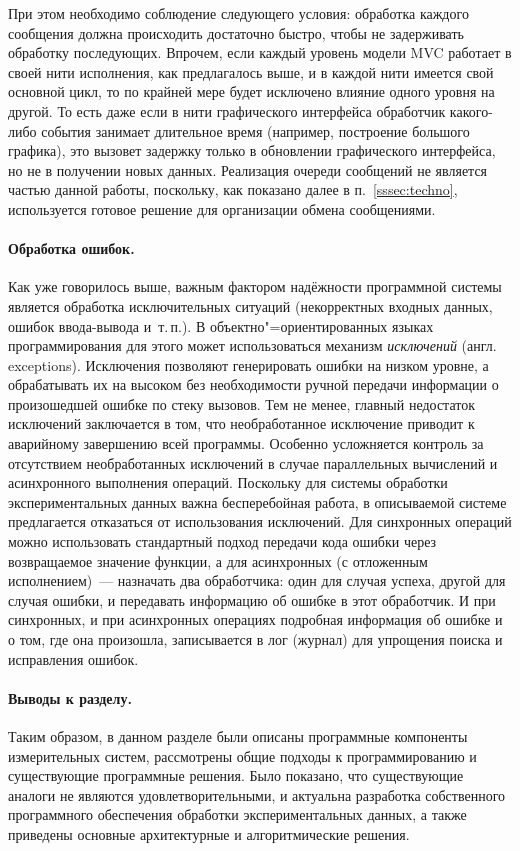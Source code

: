 \documentclass[a4paper, 14pt, titlepage]{extarticle}
\newcommand{\eng}[1]{\foreignlanguage{english}{#1}}
\newcommand{\term}[1]{\emph{#1}}
\begin{document}
  При этом необходимо соблюдение следующего условия: обработка каждого сообщения должна происходить
  достаточно быстро, чтобы не задерживать обработку
  последующих. Впрочем, если каждый уровень модели MVC работает в своей нити исполнения, как
  предлагалось выше, и в каждой нити имеется свой основной цикл, то по крайней мере будет
  исключено влияние одного уровня на другой. То есть даже если в нити графического интерфейса
  обработчик какого-либо события занимает длительное время (например, построение большого графика),
  это вызовет задержку только в обновлении графического интерфейса, но не в получении новых данных.
  Реализация очереди сообщений не является частью данной работы, поскольку, как показано далее
  в п.~\ref{sssec:techno}, используется готовое решение для организации обмена сообщениями.

  \paragraph{Обработка ошибок.} Как уже говорилось выше, важным фактором надёжности программной
  системы является обработка исключительных ситуаций (некорректных входных данных, ошибок
  ввода-вывода и~т.\,п.). В объектно"=ориентированных языках программирования для этого может
  использоваться механизм \term{исключений} (англ. \eng{exceptions}).
  Исключения позволяют генерировать ошибки на низком уровне, а обрабатывать их на высоком без
  необходимости ручной передачи информации о произошедшей ошибке по стеку вызовов.
  Тем не менее, главный недостаток исключений заключается в том, что необработанное исключение
  приводит к аварийному завершению всей программы. Особенно усложняется контроль за отсутствием
  необработанных исключений в случае параллельных вычислений и асинхронного выполнения операций.
  Поскольку для системы обработки экспериментальных данных важна бесперебойная работа, в описываемой
  системе предлагается отказаться от использования исключений. Для синхронных операций можно
  использовать стандартный подход передачи кода ошибки через возвращаемое значение функции, а для
  асинхронных (с отложенным исполнением)~--- назначать два обработчика: один для случая успеха,
  другой для случая ошибки, и передавать информацию об ошибке в этот обработчик. И при синхронных, и
  при асинхронных операциях подробная информация об ошибке и о том, где она произошла, записывается в
  лог (журнал) для упрощения поиска и исправления ошибок.


  \paragraph{Выводы к разделу.}
  Таким образом, в данном разделе были описаны программные компоненты измерительных систем,
  рассмотрены общие подходы к программированию и существующие программные решения. Было показано,
  что существующие аналоги не являются удовлетворительными, и актуальна разработка собственного
  программного обеспечения обработки экспериментальных данных, а также приведены основные
  архитектурные и алгоритмические решения.
\end{document}
